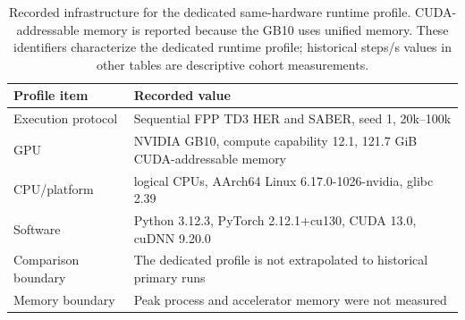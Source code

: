 \begin{table}[!htbp]
\centering
\small
\setlength{\tabcolsep}{6pt}
\begin{tabular}{>{\raggedright\arraybackslash}p{}
                >{\raggedright\arraybackslash}p{}}
\toprule
Profile item & Recorded value \\
\midrule
Execution protocol & Sequential FPP TD3 HER and SABER, seed 1, 20k--100k \\
GPU & NVIDIA GB10, compute capability 12.1, 121.7 GiB CUDA-addressable memory \\
CPU/platform & 20 logical CPUs, AArch64 Linux 6.17.0-1026-nvidia, glibc 2.39 \\
Software & Python 3.12.3, PyTorch 2.12.1+cu130, CUDA 13.0, cuDNN 9.20.0 \\
Comparison boundary & The dedicated profile is not extrapolated to historical primary runs \\
Memory boundary & Peak process and accelerator memory were not measured \\
\bottomrule
\end{tabular}
\caption{Recorded infrastructure for the dedicated same-hardware runtime
profile. CUDA-addressable memory is reported because the GB10 uses unified
memory. These identifiers characterize the dedicated runtime profile;
historical steps/s values in other tables are descriptive cohort measurements.}
\label{tab:supp-runtime-environment}
\end{table}
